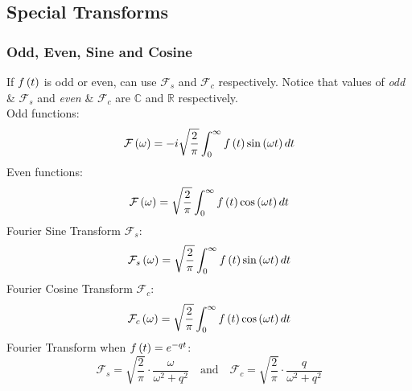 \subsection{Special Transforms}
\subsubsection{Odd, Even, Sine and Cosine}
If $f\left(t\right)$ is odd or even, can use $\mathcal{F}_s$ and $\mathcal{F}_c$ respectively. Notice that values of \textit{odd} \& $\mathcal{F}_s$ and \textit{even} \& $\mathcal{F}_c$ are $\mathbb{C}$ and $\mathbb{R}$ respectively.\vspace{2ex}\\
Odd functions:
\begin{equation}
    \mathcal{F}\left(\omega\right)=-i\sqrt{\frac{2}{\pi}}\int_{0}^{\infty}f\left(t\right)\sin\left(\omega t\right)dt
\end{equation}
Even functions:
\begin{equation}
    \mathcal{F}\left(\omega\right)=\sqrt{\frac{2}{\pi}}\int_{0}^{\infty}f\left(t\right)\cos\left(\omega t\right)dt
\end{equation}
Fourier Sine Transform $\mathcal{F}_s$:
\begin{equation}
    \mathcal{F}_s\left(\omega\right)=\sqrt{\frac{2}{\pi}}\int_{0}^{\infty}f\left(t\right)\sin\left(\omega t\right)dt
\end{equation}
Fourier Cosine Transform $\mathcal{F}_c$:
\begin{equation}
    \mathcal{F}_c\left(\omega\right)=\sqrt{\frac{2}{\pi}}\int_{0}^{\infty}f\left(t\right)\cos\left(\omega t\right)dt
\end{equation}
Fourier Transform when $f\left(t\right)=e^{-qt}$:
\begin{equation*}
    \mathcal{F}_s=\sqrt{\frac{2}{\pi}}\cdot\frac{\omega}{\omega^2+q^2}\quad\text{and}\quad\mathcal{F}_c=\sqrt{\frac{2}{\pi}}\cdot\frac{q}{\omega^2+q^2}
\end{equation*}

